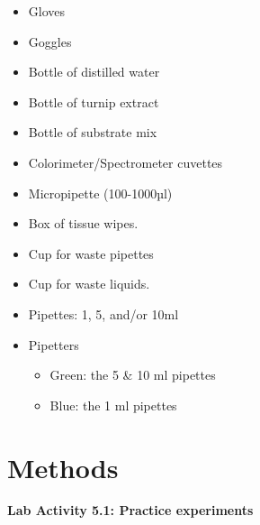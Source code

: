 \documentclass[
  letterpaper,
  DIV=11,
  numbers=noendperiod]{scrreprt}
\begin{document}
\begin{itemize}
\item
  Gloves
\item
  Goggles
\item
  Bottle of distilled water
\item
  Bottle of turnip extract
\item
  Bottle of substrate mix
\item
  Colorimeter/Spectrometer cuvettes
\item
  Micropipette (100-1000µl)
\item
  Box of tissue wipes.
\item
  Cup for waste pipettes
\item
  Cup for waste liquids.
\item
  Pipettes: 1, 5, and/or 10ml
\item
  Pipetters

  \begin{itemize}
  \item
    Green: the 5 \& 10 ml pipettes
  \item
    Blue: the 1 ml pipettes
  \end{itemize}
\end{itemize}

\section{\texorpdfstring{\textbf{Methods}}{Methods}}\label{methods-1}

\textbf{Lab Activity 5.1: Practice experiments}
\end{document}
